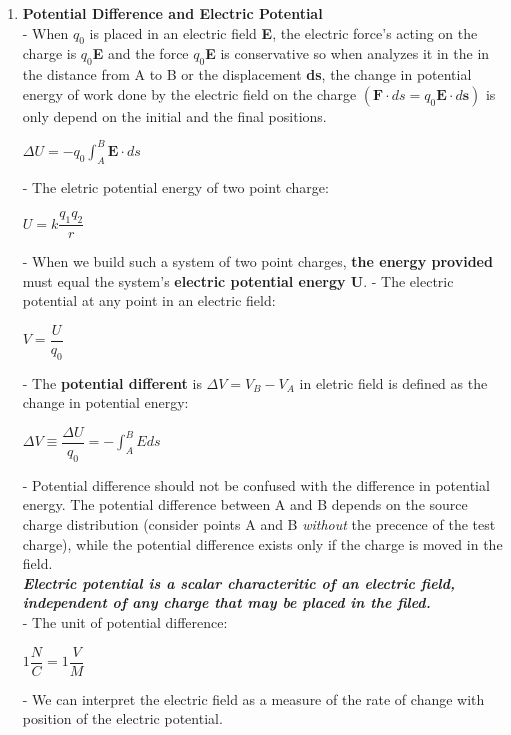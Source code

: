 \documentclass[10pt]{article}
\begin{document}
\begin{enumerate}
	\item \textbf{Potential Difference and Electric Potential}\\	
	- When $q_{0}$ is placed in an electric field \textbf{E}, the electric force's acting on the charge is $q_{0}$\textbf{E} and the force $q_{0}$\textbf{E} is conservative so when analyzes it in the in the distance from A to B or the displacement \textbf{ds}, the change in potential energy of work done by the electric field on the charge $(\textbf{F} \cdot ds = q_{0} \textbf{E} \cdot d \textbf{s})$ is only depend on the initial and the final positions.
	\begin{mybox}
	\begin{center}
	$\Delta U = -q_0 \displaystyle \int_{A}^{B} \textbf{E} \cdot ds$
	\end{center}
	\end{mybox}
	- The eletric potential energy of two point charge:
	\begin{mybox}
	\begin{center}
	$U = k \dfrac{q_1q_2}{r}$
	\end{center}
	\end{mybox}
	- When we build such a system of two point  charges, \textbf{the energy provided} must equal the system's \textbf{electric potential energy U}.
	- The electric potential at any point in an electric field:
	\begin{mybox}
	\begin{center}
	$V = \dfrac{U}{q_0}$
	\end{center}
	\end{mybox}
	- The \textbf{potential different} is $\Delta V = V_B -V_A$ in eletric field is defined as the change in potential energy:
	\begin{mybox}
	\begin{center}
	$\Delta V \equiv \dfrac{\Delta U}{q_0} = - \displaystyle \int_{A}^{B} E ds$
	\end{center}
	\end{mybox}
	- Potential difference should not be confused with the difference in potential energy. The potential difference between A and B depends on the source charge distribution (consider points A and B \textit{without} the precence of the test charge), while the potential difference exists only if the charge is moved in the field.\\
	\textbf{\textit{Electric potential is a scalar characteritic of an electric field, independent of any charge that may be placed in the filed.}}\\	
	- The unit of potential difference:
	\begin{center}
	$1 \dfrac{N}{C} = 1 \dfrac{V}{M}$
	\end{center}
	- We can interpret the electric field as a measure of the rate of change with position of the electric potential. 
\end{enumerate}	  
\end{document}
